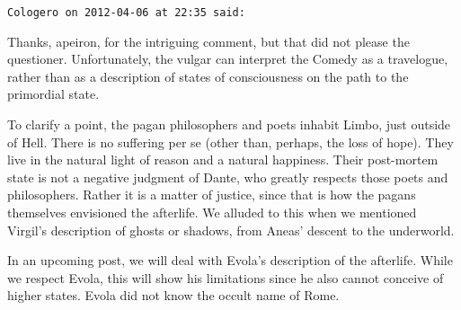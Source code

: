 \begin{footnotesize}
\begin{sffamily}
\hfill

\texttt{Cologero on 2012-04-06 at 22:35 said: }

Thanks, apeiron, for the intriguing comment, but that did not please the questioner. Unfortunately, the vulgar can interpret the Comedy as a travelogue, rather than as a description of states of consciousness on the path to the primordial state.

To clarify a point, the pagan philosophers and poets inhabit Limbo, just outside of Hell. There is no suffering per se (other than, perhaps, the loss of hope). They live in the natural light of reason and a natural happiness. Their post-mortem state is not a negative judgment of Dante, who greatly respects those poets and philosophers. Rather it is a matter of justice, since that is how the pagans themselves envisioned the afterlife. We alluded to this when we mentioned Virgil's description of ghosts or shadows, from Aneas' descent to the underworld.

In an upcoming post, we will deal with Evola's description of the afterlife. While we respect Evola, this will show his limitations since he also cannot conceive of higher states. Evola did not know the occult name of Rome.


\end{sffamily}\end{footnotesize}
